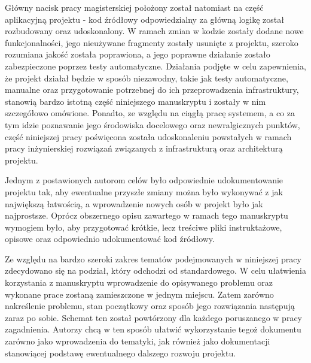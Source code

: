 Główny nacisk pracy magisterskiej położony został natomiast na część aplikacyjną projektu - kod źródłowy odpowiedzialny za główną logikę został rozbudowany oraz udoskonalony. W ramach zmian w kodzie zostały dodane nowe funkcjonalności, jego nieużywane fragmenty zostały usunięte z projektu, szeroko rozumiana jakość została poprawiona, a jego poprawne działanie zostało zabezpieczone poprzez testy automatyczne. Działania podjęte w celu zapewnienia, że projekt działał będzie w sposób niezawodny, takie jak testy automatyczne, manualne oraz przygotowanie potrzebnej do ich przeprowadzenia infrastruktury, stanowią bardzo istotną część niniejszego manuskryptu i zostały w nim szczegółowo omówione. Ponadto, ze względu na ciągłą pracę systemem, a co za tym idzie poznawanie jego środowiska docelowego oraz newralgicznych punktów, część niniejszej pracy poświęcona została udoskonaleniu powstałych w ramach pracy inżynierskiej rozwiązań związanych z infrastrukturą oraz architekturą projektu.

Jednym z postawionych autorom celów było odpowiednie udokumentowanie projektu tak, aby ewentualne przyszłe zmiany można było wykonywać z jak największą łatwością, a wprowadzenie nowych osób w projekt było jak najprostsze. Oprócz obszernego opisu zawartego w ramach tego manuskryptu wymogiem było, aby przygotować krótkie, lecz treściwe pliki instruktażowe, opisowe oraz odpowiednio udokumentować kod źródłowy.

Ze względu na bardzo szeroki zakres tematów podejmowanych w niniejszej pracy zdecydowano się na podział, który odchodzi od standardowego. W celu ułatwienia korzystania z manuskryptu wprowadzenie do opisywanego problemu oraz wykonane prace zostaną zamieszczone w jednym miejscu. Zatem zarówno nakreślenie problemu, stan początkowy oraz sposób jego rozwiązania następują zaraz po sobie. Schemat ten został powtórzony dla każdego poruszanego w pracy zagadnienia. Autorzy chcą w ten sposób ułatwić wykorzystanie tegoż dokumentu zarówno jako wprowadzenia do tematyki, jak również jako dokumentacji stanowiącej podstawę ewentualnego dalszego rozwoju projektu.
